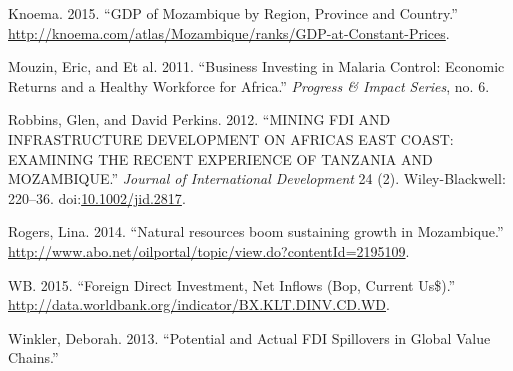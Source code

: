\documentclass[]{elsarticle} %
\begin{document}
\hypertarget{ref-knoema}{}
Knoema. 2015. ``GDP of Mozambique by Region, Province and Country.''
\url{http://knoema.com/atlas/Mozambique/ranks/GDP-at-Constant-Prices}.

\hypertarget{ref-Mouzin2011}{}
Mouzin, Eric, and Et al. 2011. ``Business Investing in Malaria Control:
Economic Returns and a Healthy Workforce for Africa.'' \emph{Progress \&
Impact Series}, no. 6.

\hypertarget{ref-Robbins2012}{}
Robbins, Glen, and David Perkins. 2012. ``MINING FDI AND INFRASTRUCTURE
DEVELOPMENT ON AFRICAS EAST COAST: EXAMINING THE RECENT EXPERIENCE OF
TANZANIA AND MOZAMBIQUE.'' \emph{Journal of International Development}
24 (2). Wiley-Blackwell: 220--36.
doi:\href{https://doi.org/10.1002/jid.2817}{10.1002/jid.2817}.

\hypertarget{ref-Rogers}{}
Rogers, Lina. 2014. ``Natural resources boom sustaining growth in
Mozambique.''
\url{http://www.abo.net/oilportal/topic/view.do?contentId=2195109}.

\hypertarget{ref-wbdata}{}
WB. 2015. ``Foreign Direct Investment, Net Inflows (Bop, Current
Us\$).'' \url{http://data.worldbank.org/indicator/BX.KLT.DINV.CD.WD}.

\hypertarget{ref-Winkler}{}
Winkler, Deborah. 2013. ``Potential and Actual FDI Spillovers in Global
Value Chains.''
\end{document}
